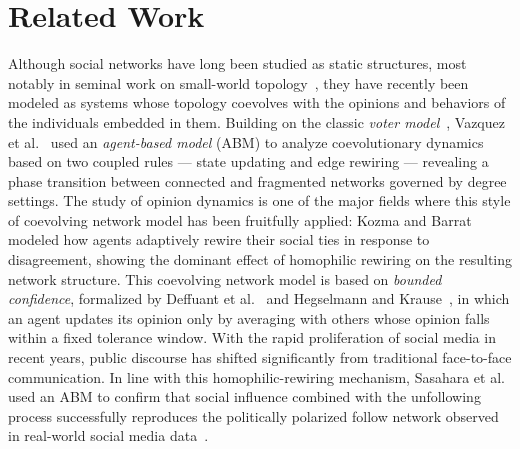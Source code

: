 \documentclass{svproc}
\begin{document}
\section{Related Work}\label{sec:related}
Although social networks have long been studied as static structures,
most notably in seminal work on small-world topology~\cite{watts1998},
they have recently been modeled as systems whose topology coevolves
with the opinions and behaviors of the individuals embedded in
them. Building on the classic \emph{voter model}~\cite{clifford1973},
Vazquez et al.~\cite{vazquez2008} used an {\em agent-based model}
(ABM) to analyze coevolutionary dynamics based on two coupled rules
--- state updating and edge rewiring --- revealing a phase transition
between connected and fragmented networks governed by degree
settings. The study of opinion dynamics is one of the major fields
where this style of coevolving network model has been fruitfully
applied: Kozma and Barrat~\cite{kozma2008} modeled how agents
adaptively rewire their social ties in response to disagreement,
showing the dominant effect of homophilic rewiring on the resulting
network structure. This coevolving network model is based on {\em bounded
confidence}, formalized by Deffuant et al.~\cite{deffuant2000} and
Hegselmann and Krause~\cite{hegselmann2002}, in which an agent updates
its opinion only by averaging with others whose opinion falls within a
fixed tolerance window. With the rapid proliferation of social media
in recent years, public discourse has shifted significantly from
traditional face-to-face communication. In line with this
homophilic-rewiring mechanism, Sasahara et al.~\cite{sasahara2020}
used an ABM to confirm that social influence combined with the
unfollowing process successfully reproduces the politically polarized
follow network observed in real-world social media
data~\cite{conover2011}.
\par
\end{document}
